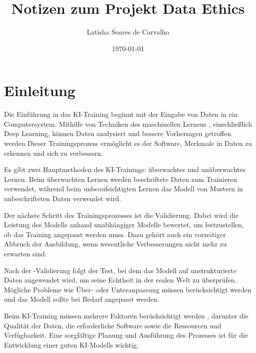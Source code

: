 \documentclass{article}
\title{Notizen zum Projekt Data Ethics}
\author{Latisha Soares de Carvalho}
\date{\today}
\begin{document}
\maketitle




\tableofcontents
\section {Einleitung}                            
    
    Die Einführung in das KI-Training beginnt mit der Eingabe von Daten in ein Computersystem.
    Mithilfe von Techniken des maschinellen Lernens , einschließlich Deep Learning, können Daten analysiert und bessere Vorhersagen getroffen werden
    Dieser Trainingsprozess ermöglicht es der Software, Merkmale in Daten zu erkennen und sich zu verbessern.
    
    Es gibt zwei Hauptmethoden des KI-Trainings: überwachtes und unüberwachtes Lernen.
    Beim überwachten Lernen werden beschriftete Daten zum Trainieren verwendet, während beim unbeaufsichtigten Lernen das Modell von Mustern in unbeschrifteten Daten verwendet wird.
    
    Der nächste Schritt des Trainingsprozesses ist die Validierung. Dabei wird die Leistung des Modells anhand unabhängiger Modelle bewertet, um festzustellen, ob das Training angepasst werden muss.
    Dazu gehört auch ein vorzeitiger Abbruch der Ausbildung, wenn wesentliche Verbesserungen nicht mehr zu erwarten sind.

    Nach der -Validierung folgt der Test, bei dem das Modell auf unstrukturierte Daten angewendet wird, um seine Echtheit in der realen Welt zu überprüfen.
    Mögliche Probleme wie Über- oder Unteranpassung müssen berücksichtigt werden und das Modell sollte bei Bedarf angepasst werden.

    Beim KI-Training müssen mehrere Faktoren berücksichtigt werden , darunter die Qualität der Daten, die erforderliche Software sowie die Ressourcen und Verfügbarkeit.
    Eine sorgfältige Planung und Ausführung des Prozesses ist für die Entwicklung einer guten KI-Modells wichtig.

\end{document}
